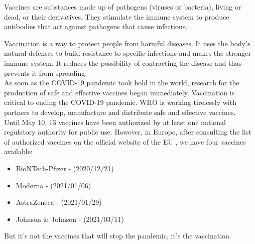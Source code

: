 Vaccines are substances made up of pathogens (viruses or bacteria), living or dead, or their derivatives. They stimulate the immune system to produce antibodies that act against pathogens that cause infections.

Vaccination is a way to protect people from harmful diseases. It uses the body's natural defenses to build resistance to specific infections and makes the
 stronger immune system.
It reduces the possibility of contracting the disease and thus prevents it from spreading.
\\
As soon as the COVID-19 pandemic took hold in the world, research for the production of safe and effective vaccines began immediately. Vaccination is critical to ending the COVID-19 pandemic. WHO is working tirelessly with partners to develop, manufacture and distribute safe and effective vaccines.
\\
Until May 10, 13 vaccines have been authorized by at least one national regulatory authority for public use. However, in Europe, after consulting the list of authorized vaccines on the official website of the \ac{EU} \cite {EU}, we have four vaccines available: 
\begin{itemize}
    \item BioNTech-Pfizer - (2020/12/21)
    \item Moderna - (2021/01/06)
    \item AstraZeneca - (2021/01/29)
    \item Johnson \& Johnson - (2021/03/11)
\end{itemize}
But it's not the vaccines that will stop the pandemic, it's the vaccination. 
\\


